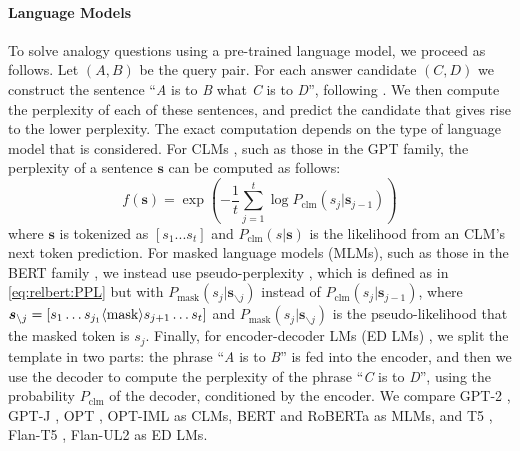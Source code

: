 \documentclass[3p]{elsarticle}
\begin{document}
{\paragraph{Language Models} 
To solve analogy questions using a pre-trained language model, we proceed as follows. Let $(A,B)$ be the query pair. For each answer candidate $(C,D)$ we construct the sentence ``\textit{A} is to \textit{B} what \textit{C} is to \textit{D}'', following \cite{GPT3}. 
We then compute the perplexity of each of these sentences, and predict the candidate that gives rise to the lower perplexity. The exact computation depends on the type of language model that is considered. For CLMs \cite{radford2018improving,radford2019language,GPT3}, such as those in the GPT family, the perplexity of a sentence ${\boldsymbol s}$ can be computed as follows:
\begin{equation}\label{eq:relbert:PPL}
f({\boldsymbol s}) = \exp \left( - \frac{1}{t}\sum_{j=1}^t \log{ P_{\text{clm}}(s_j | {\boldsymbol s}_{j-1} ) } \right)
\end{equation}
where ${\boldsymbol s}$ is tokenized as $[s_1 ... s_t]$ and
$P_{\text{clm}}(s | {\boldsymbol s})$ is the likelihood from an CLM's next token prediction.
For masked language models (MLMs), such as those in the BERT family \cite{devlin-etal-2019-bert,RoBERTa}, we instead use pseudo-perplexity \cite{salazar-etal-2020-masked}, which is defined as in \eqref{eq:relbert:PPL} but with $P_{\text{mask}}(s_j | {\boldsymbol s}_{\backslash j} )$ instead of $P_{\text{clm}}(s_j | {\boldsymbol s}_{j-1} )$, where ${\boldsymbol s}_{\backslash j} = [s_1 \dots s_{j_1} \text{\textlangle mask\textrangle} s_{j+1} \dots s_t ]$ and $P_{\text{mask}}(s_j | {\boldsymbol s}_{\backslash j})$ is the pseudo-likelihood \cite{wang-cho-2019-bert} that the masked token is $s_j$. Finally, for encoder-decoder LMs (ED LMs) \cite{2020t5,lewis-etal-2020-bart}, we split the template in two parts: the phrase ``\textit{A} is to \textit{B}'' is fed into the encoder, and then we use the decoder to compute the perplexity of the phrase ``\textit{C} is to \textit{D}'', using the probability $P_{\text{clm}}$ of the decoder, conditioned by the encoder.
We compare GPT-2 \cite{radford2019language}, GPT-J \cite{gpt-j}, OPT \cite{zhang2022opt}, OPT-IML \cite{iyer2022opt} as CLMs, BERT \cite{devlin-etal-2019-bert} and RoBERTa \cite{RoBERTa} as MLMs, and T5 \cite{2020t5}, Flan-T5 \cite{https://doi.org/10.48550/arxiv.2210.11416}, Flan-UL2 \cite{tay2023ul2} as ED LMs.

}
\end{document}
